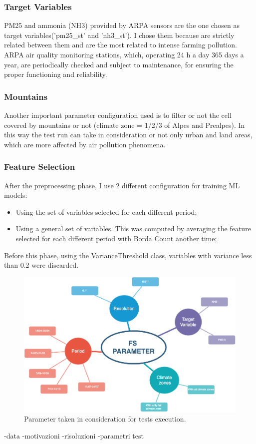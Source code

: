 \subsubsection{Target Variables}
PM25 and ammonia (NH3) provided by ARPA sensors are the one chosen as target variables('pm25\_st' and 'nh3\_st'). I chose them because are strictly related between them and are the most related to intense farming pollution.
ARPA air quality monitoring stations, which, operating 24 h a day 365 days a year, are periodically checked and subject to maintenance, for ensuring the proper functioning and reliability.


\subsubsection{Mountains}
Another important parameter configuration used is to filter or not the cell covered by mountains or not (climate zone = 1/2/3 of Alpes and Prealpes). In this way the test run can take in consideration or not only urban and land areas, which are more affected by air pollution phenomena.


\subsubsection{Feature Selection}
After the preprocessing phase, I use 2 different configuration for training ML models:
\begin{itemize}
    \item Using the set of variables selected for each different period;
    \item Using a general set of variables. This was computed by averaging the feature selected for each different period with Borda Count another time;
\end{itemize}
Before this phase, using the VarianceThreshold class, variables with variance less than 0.2 were discarded. 

\begin{figure}
    \centering
    \includegraphics[width=.9\textwidth]{src/images/test_param.png}
    \caption{Parameter taken in consideration for tests execution.}
    \label{fig:test_params}
\end{figure}
-data
-motivazioni
-risoluzioni
-parametri test
